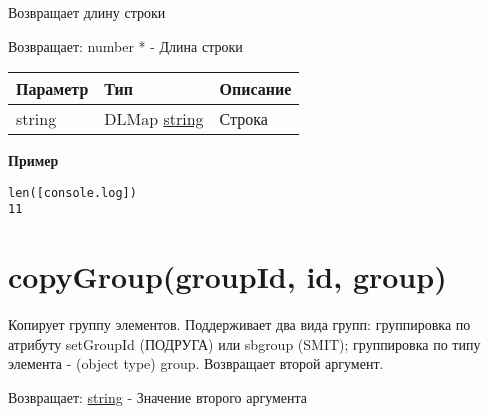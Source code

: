 Возвращает длину строки

Возвращает: number \textbar{} * - Длина строки

\begin{longtable}[]{@{}lll@{}}
\toprule
Параметр & Тип & Описание\tabularnewline
\midrule
\endhead
string & DLMap \textbar{} \protect\hyperlink{string}{string} &
Строка\tabularnewline
\bottomrule
\end{longtable}

\textbf{Пример}

\begin{verbatim}
len([console.log])
11
\end{verbatim}

\hypertarget{copygroupgroupid-id-group-string}{%
\section{copyGroup(groupId, id, group)}\label{copygroupgroupid-id-group-string}}

Копирует группу элементов. Поддерживает два вида групп: группировка по
атрибуту setGroupId (ПОДРУГА) или sbgroup (SMIT); группировка по типу
элемента - (object type) group. Возвращает второй аргумент.

Возвращает: \protect\hyperlink{string}{string} - Значение второго
аргумента

